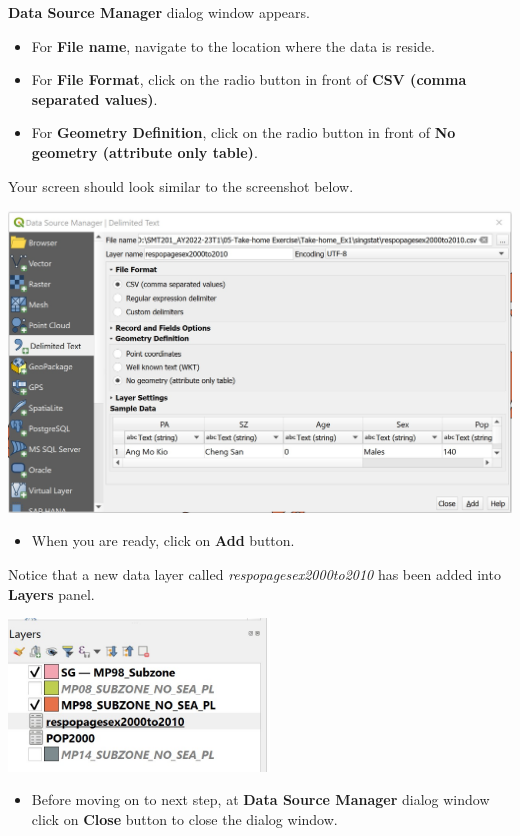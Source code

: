 \documentclass[
  letterpaper,
  DIV=11,
  numbers=noendperiod]{scrreprt}
\providecommand{\tightlist}{%
  \setlength{\itemsep}{0pt}\setlength{\parskip}{0pt}}\usepackage{longtable,booktabs,array}
\begin{document}
\textbf{Data Source Manager} dialog window appears.

\begin{itemize}
\item
  For \textbf{File name}, navigate to the location where the data is
  reside.
\item
  For \textbf{File Format}, click on the radio button in front of
  \textbf{CSV (comma separated values)}.
\item
  For \textbf{Geometry Definition}, click on the radio button in front
  of \textbf{No geometry (attribute only table)}.
\end{itemize}

Your screen should look similar to the screenshot below.

\includegraphics{./img03/image38.jpg}

\begin{itemize}
\tightlist
\item
  When you are ready, click on \textbf{Add} button.
\end{itemize}

Notice that a new data layer called \emph{respopagesex2000to2010} has
been added into \textbf{Layers} panel.

\includegraphics[width=2.72917in,height=\textheight]{./img03/image39.jpg}

\begin{itemize}
\tightlist
\item
  Before moving on to next step, at \textbf{Data Source Manager} dialog
  window click on \textbf{Close} button to close the dialog window.
\end{itemize}
\end{document}
